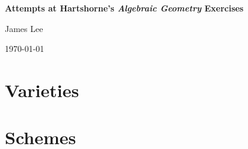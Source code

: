 \documentclass[oneside,openany]{book}
\newcommand{\combinedpagefooter}{%
    \thispagestyle{empty}%
    \begin{tikzpicture}[remember picture,overlay]
        \node[
            fill=white,
            minimum width=3cm,
            minimum height=0.6in,
            inner sep=0pt,
            font=\normalfont\normalsize
        ] at ([yshift=0.55in]current page.south)
        {\thepage};
    \end{tikzpicture}%
}
\begin{document}
\begin{titlepage}
    \centering
    \vspace*{3cm}

    {\Huge\bfseries
    Attempts at Hartshorne's \textit{Algebraic Geometry} Exercises\par}

    \vspace{2cm}
    {\Large James Lee\par}

    \vfill
    {\large \today\par}
\end{titlepage}

\frontmatter
\tableofcontents

\mainmatter

\setcounter{chapter}{0}
\chapter{Varieties}

\setcounter{section}{0}


\setcounter{section}{1}


\setcounter{section}{2}


\setcounter{section}{3}


\setcounter{section}{4}


\setcounter{section}{5}


\setcounter{section}{6}


\setcounter{chapter}{1}
\chapter{Schemes}
\end{document}
